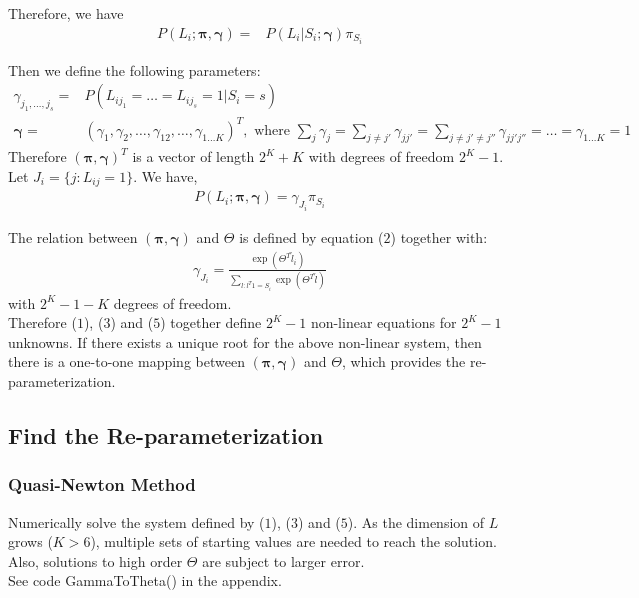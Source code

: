 \documentclass[11 pt, a4paper]{article}  %
\begin{document}
Therefore, we have
\begin{align*}
P(L_i;\boldsymbol\pi, \boldsymbol\gamma) = &P(L_i|S_i;\boldsymbol\gamma)\pi_{S_i}
\end{align*}

Then we define the following parameters:
\begin{align}
\gamma_{j_1,\ldots,j_s} = & P(L_{ij_1}=\ldots=L_{ij_s}=1|S_i=s)\\
\boldsymbol\gamma = & (\gamma_1,\gamma_2,\ldots,\gamma_{12},\ldots,\gamma_{1\ldots K})^T , \text{ where }
\sum_{j} \gamma_j = \sum_{j\neq j'} \gamma_{jj'} = \sum_{j\neq j'\neq j''} \gamma_{jj'j''} = \ldots = \gamma_{1\ldots K} = 1 \nonumber
\end{align}
Therefore $(\boldsymbol\pi, \boldsymbol\gamma)^T$ is a vector of length $2^K+K$ with degrees of freedom $2^K-1$.\\

Let $J_i = \{j: L_{ij}=1\}$. We have,
\begin{align}
P(L_i;\boldsymbol\pi, \boldsymbol\gamma) = \gamma_{J_i} \pi_{S_i}
\end{align}

The relation between $(\boldsymbol\pi, \boldsymbol\gamma)$ and $\Theta$ is defined by equation ($2$) together with:
\begin{align}
\gamma_{J_i} = \frac{\exp(\Theta^T \tilde{l}_i)}{\sum_{l:l^T1=S_i}\exp(\Theta^T\tilde{l})}
\end{align}
with $2^K-1-K$ degrees of freedom.\\

Therefore ($1$), ($3$) and ($5$) together define $2^K-1$ non-linear equations for $2^K-1$ unknowns. If there exists a unique root for the above non-linear system, then there is a one-to-one mapping between $(\boldsymbol\pi, \boldsymbol\gamma)$ and $\Theta$, which provides the re-parameterization.

\subsection{Find the Re-parameterization}
\subsubsection{Quasi-Newton Method}
Numerically solve the system defined by ($1$), ($3$) and ($5$). As the dimension of $L$ grows ($K>6$), multiple sets of starting values are needed to  reach the solution. Also, solutions to high order $\Theta$ are subject to larger error. \\
See code GammaToTheta() in the appendix.
\end{document}
